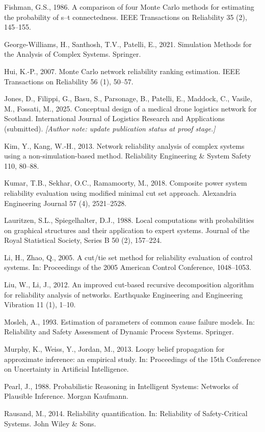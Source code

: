 \documentclass[preprint,12pt]{elsarticle}
\theoremstyle{definition}
\begin{document}
Fishman, G.S., 1986. A comparison of four Monte Carlo methods for estimating the probability of s--t
connectedness. IEEE Transactions on Reliability 35 (2), 145--155.

George-Williams, H., Santhosh, T.V., Patelli, E., 2021. Simulation Methods for the Analysis of Complex
Systems. Springer.

Hui, K.-P., 2007. Monte Carlo network reliability ranking estimation. IEEE Transactions on Reliability
56 (1), 50--57.

Jones, D., Filippi, G., Basu, S., Parsonage, B., Patelli, E., Maddock, C., Vasile, M., Fossati, M.,
2025. Conceptual design of a medical drone logistics network for Scotland. International Journal of
Logistics Research and Applications (submitted). \emph{[Author note: update publication status at
proof stage.]}

Kim, Y., Kang, W.-H., 2013. Network reliability analysis of complex systems using a
non-simulation-based method. Reliability Engineering \& System Safety 110, 80--88.

Kumar, T.B., Sekhar, O.C., Ramamoorty, M., 2018. Composite power system reliability evaluation using
modified minimal cut set approach. Alexandria Engineering Journal 57 (4), 2521--2528.

Lauritzen, S.L., Spiegelhalter, D.J., 1988. Local computations with probabilities on graphical
structures and their application to expert systems. Journal of the Royal Statistical Society, Series B
50 (2), 157--224.

Li, H., Zhao, Q., 2005. A cut/tie set method for reliability evaluation of control systems. In:
Proceedings of the 2005 American Control Conference, 1048--1053.

Liu, W., Li, J., 2012. An improved cut-based recursive decomposition algorithm for reliability analysis
of networks. Earthquake Engineering and Engineering Vibration 11 (1), 1--10.

Mosleh, A., 1993. Estimation of parameters of common cause failure models. In: Reliability and Safety
Assessment of Dynamic Process Systems. Springer.

Murphy, K., Weiss, Y., Jordan, M., 2013. Loopy belief propagation for approximate inference: an
empirical study. In: Proceedings of the 15th Conference on Uncertainty in Artificial Intelligence.

Pearl, J., 1988. Probabilistic Reasoning in Intelligent Systems: Networks of Plausible Inference.
Morgan Kaufmann.

Rausand, M., 2014. Reliability quantification. In: Reliability of Safety-Critical Systems. John Wiley
\& Sons.
\end{document}
